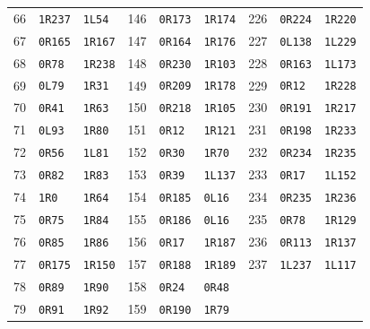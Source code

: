 \begin{longtable}{rll@{\hspace{0.45cm}}rll@{\hspace{0.45cm}}rll}
66 & \texttt{1R237} & \texttt{1L54} & 146 & \texttt{0R173} & \texttt{1R174} & 226 & \texttt{0R224} & \texttt{1R220} \\
67 & \texttt{0R165} & \texttt{1R167} & 147 & \texttt{0R164} & \texttt{1R176} & 227 & \texttt{0L138} & \texttt{1L229} \\
68 & \texttt{0R78} & \texttt{1R238} & 148 & \texttt{0R230} & \texttt{1R103} & 228 & \texttt{0R163} & \texttt{1L173} \\
69 & \texttt{0L79} & \texttt{1R31} & 149 & \texttt{0R209} & \texttt{1R178} & 229 & \texttt{0R12} & \texttt{1R228} \\
70 & \texttt{0R41} & \texttt{1R63} & 150 & \texttt{0R218} & \texttt{1R105} & 230 & \texttt{0R191} & \texttt{1R217} \\
71 & \texttt{0L93} & \texttt{1R80} & 151 & \texttt{0R12} & \texttt{1R121} & 231 & \texttt{0R198} & \texttt{1R233} \\
72 & \texttt{0R56} & \texttt{1L81} & 152 & \texttt{0R30} & \texttt{1R70} & 232 & \texttt{0R234} & \texttt{1R235} \\
73 & \texttt{0R82} & \texttt{1R83} & 153 & \texttt{0R39} & \texttt{1L137} & 233 & \texttt{0R17} & \texttt{1L152} \\
74 & \texttt{1R0} & \texttt{1R64} & 154 & \texttt{0R185} & \texttt{0L16} & 234 & \texttt{0R235} & \texttt{1R236} \\
75 & \texttt{0R75} & \texttt{1R84} & 155 & \texttt{0R186} & \texttt{0L16} & 235 & \texttt{0R78} & \texttt{1R129} \\
76 & \texttt{0R85} & \texttt{1R86} & 156 & \texttt{0R17} & \texttt{1R187} & 236 & \texttt{0R113} & \texttt{1R137} \\
77 & \texttt{0R175} & \texttt{1R150} & 157 & \texttt{0R188} & \texttt{1R189} & 237 & \texttt{1L237} & \texttt{1L117} \\
78 & \texttt{0R89} & \texttt{1R90} & 158 & \texttt{0R24} & \texttt{0R48} &  &  &  \\
79 & \texttt{0R91} & \texttt{1R92} & 159 & \texttt{0R190} & \texttt{1R79} &  &  &  \\
\bottomrule
\end{longtable}
\normalsize
